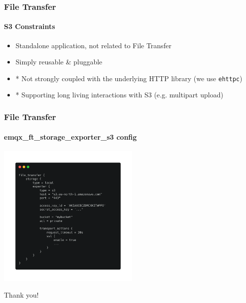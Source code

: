 \documentclass{beamer}
\begin{document}
\begin{frame}
    \frametitle{File Transfer}
    \framesubtitle{S3 Constraints}
    \begin{itemize}
        \item Standalone application, not related to File Transfer
        \item Simply reusable \& pluggable
        \item * Not strongly coupled with the underlying HTTP library (we use \lstinline{ehttpc})
        \item * Supporting long living interactions with S3 (e.g. multipart upload)
    \end{itemize}
    \begin{center}
    \end{center}
\end{frame}

\begin{frame}
    \frametitle{File Transfer}
    \framesubtitle{emqx\_ft\_storage\_exporter\_s3 config}

    \begin{center}
        \includegraphics[height=7cm, keepaspectratio]{images/ft_storage_fs_exports_s3_conf.png}
    \end{center}
\end{frame}

\begin{frame}
    \begin{center}
        Thank you!
    \end{center}
\end{frame}
\end{document}
